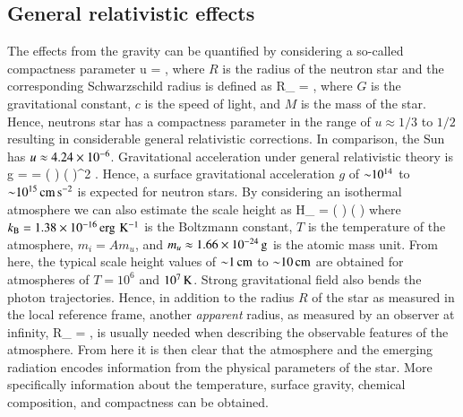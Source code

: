 \subsection{General relativistic effects}
The effects from the gravity can be quantified by considering a so-called compactness parameter
\be
u = ,
\ee
where $R$ is the radius of the neutron star and the corresponding Schwarzschild radius is defined as
\be
R_{} =    \km,
\ee
where $G$ is the gravitational constant, $c$ is the speed of light, and $M$ is the mass of the star.\cite[see e.g.,][]{Gravitation, Wald84}
Hence, neutrons star has a compactness parameter in the range of $u \approx 1/3$ to $1/2$ resulting in considerable general relativistic corrections.
In comparison, the Sun has $u \approx 4.24 \times 10^{-6}$.
Gravitational acceleration under general relativistic theory is
\be
g =   =   \left(  \right) \left(  \right)^2 \cmss.
\ee
Hence, a surface gravitational acceleration $g$ of $\mathord{\sim} 10^{14}$ to $\mathord{\sim} 10^{15}\, \mathrm{cm}\,\mathrm{s}^{-2}$ is expected for neutron stars.
By considering an isothermal atmosphere we can also estimate the scale height as
\be
H_{} =  \approx {} \left(  \right) \left(  \right) \cm
\ee
where $k_{\mathrm{B}} = 1.38 \times 10^{-16} \, \mathrm{erg} \, \, \mathrm{K}^{-1}$ is the Boltzmann constant, $T$ is the temperature of the atmosphere, $m_i = A m_u$, and $m_u \approx 1.66 \times 10^{-24}\, \mathrm{g}$ is the atomic mass unit.
From here, the typical scale height values of $\mathord{\sim} 1\, \mathrm{cm}$ to $\mathord{\sim} 10\, \mathrm{cm}$ are obtained for atmospheres of $T=10^6$ and $10^7\, \mathrm{K}$.\cite{ZP02, Potekhin14}
Strong gravitational field also bends the photon trajectories.\cite[see e.g.,][]{PFC83}
Hence, in addition to the radius $R$ of the star as measured in the local reference frame, another \emph{apparent} radius, as measured by an observer at infinity, 
\be
R_{\infty} = ,
\ee
is usually needed when describing the observable features of the atmosphere.
From here it is then clear that the atmosphere and the emerging radiation encodes information from the physical parameters of the star.
More specifically information about the temperature, surface gravity, chemical composition, and compactness can be obtained.

